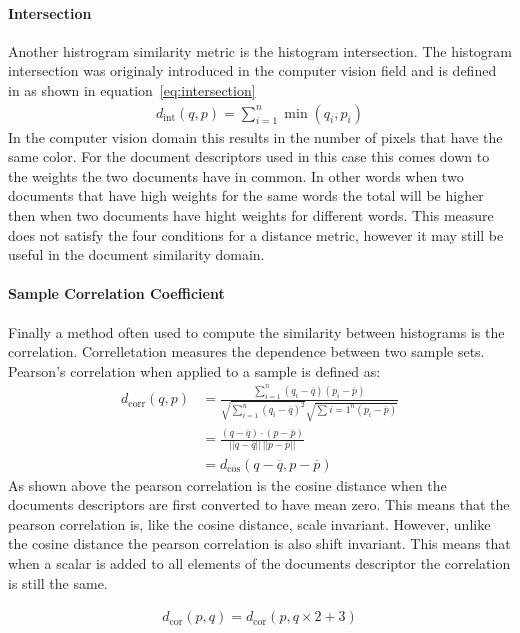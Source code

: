 \paragraph{Intersection} Another histrogram similarity metric is the histogram
intersection. The histogram intersection \citep{swain1991color} was originaly
introduced in the computer vision field and is defined in as shown in
equation~\ref{eq:intersection}
\begin{align}
  d_\textrm{int}(q,p) = \sum_{i=1}^n \min(q_i, p_i) \label{eq:intersection}
\end{align}
In the computer vision domain this results in the number of pixels that have
the same color. For the document descriptors used in this case this comes
down to the weights the two documents have in common. In other words when
two documents that have high weights for the same words the total will be
higher then when two documents have hight weights for different words. This
measure does not satisfy the four conditions for a distance metric, however
it may still be useful in the document similarity domain.

\paragraph{Sample Correlation Coefficient} Finally a method often used to compute the
similarity between histograms is the correlation. Correlletation measures
the dependence between two sample sets. Pearson's correlation when applied to
a sample is defined as:
\begin{align}
  d_{\textrm{corr}}(q,p) &= \frac{\sum_{i=1}^n(q_i - \overline{q})(p_i - \overline{p})}{\sqrt{\sum_{i=1}^n(q_i - \overline{q})^2}\sqrt{\sum{i=1}^n(p_i - \overline{p})}} \\
    &= \frac{(q - \overline{q}) \cdot (p - \overline{p})}{||q - \overline{q}||\,||p - \overline{p}||} \\
    &= d_\textrm{cos}(q - \overline{q}, p - \overline{p})
\end{align}
As shown above the pearson correlation is the cosine distance when the 
documents descriptors are first converted to have mean zero. This means that
the pearson correlation is, like the cosine distance, scale invariant. However,
unlike the cosine distance the pearson correlation is also shift invariant. This
means that when a scalar is added to all elements of the documents descriptor
the correlation is still the same.

\begin{align*}
  d_\textrm{cor}(p,q) = d_\textrm{cor}(p, q\times2 + 3)
\end{align*}
